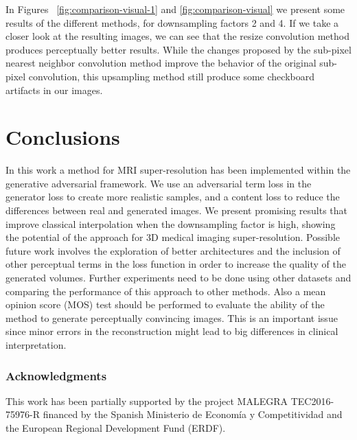 \documentclass{article}
\begin{document}
In Figures ~\ref{fig:comparison-visual-1} and \ref{fig:comparison-visual} we present some results of the different methods, for downsampling factors 2 and 4. If we take a closer look at the resulting images, we can see that the resize convolution method produces perceptually better results. While the changes proposed by the sub-pixel nearest neighbor convolution method improve the behavior of the original sub-pixel convolution, this upsampling method still produce some checkboard artifacts in our images.

\section{Conclusions}
\label{sec:foot}

In this work a method for MRI super-resolution has been implemented within the generative adversarial framework.
We use an adversarial term loss in the generator loss to create more realistic samples, and a content loss to reduce the differences between real and generated images.
We present promising results that improve classical interpolation when the downsampling factor is high, showing the potential of the approach for 3D medical imaging super-resolution.
Possible future work involves the exploration of better architectures and the inclusion of other perceptual terms in the loss function in order to increase the quality of the generated volumes. Further experiments need to be done using other datasets and comparing the performance of this approach to other methods. Also a mean opinion score (MOS) test should be performed to evaluate the ability of the method to generate perceptually convincing images. This is an important issue since minor errors in the reconstruction might lead to big differences in clinical interpretation.














\subsubsection*{Acknowledgments}

This work has been partially supported by the project  MALEGRA TEC2016-75976-R financed by the Spanish Ministerio de Econom\'{i}a y Competitividad and the European Regional Development Fund (ERDF).


\medskip



\end{document}
